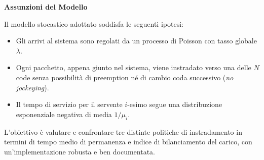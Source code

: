 \documentclass[12pt,a4paper]{article}
\begin{document}
\noindent
\textbf{Assunzioni del Modello}

Il modello stocastico adottato soddisfa le seguenti ipotesi:
\begin{itemize}
  \item Gli arrivi al sistema sono regolati da un processo di Poisson con tasso globale $\lambda$.
  \item Ogni pacchetto, appena giunto nel sistema, viene instradato verso una delle $N$ code senza possibilità di preemption né di cambio coda successivo (\textit{no jockeying}).
  \item Il tempo di servizio per il servente $i$-esimo segue una distribuzione esponenziale negativa di media $1/\mu_i$.
\end{itemize}

\noindent
L'obiettivo è valutare e confrontare tre distinte politiche di instradamento in termini di tempo medio di permanenza e indice di bilanciamento del carico, con un'implementazione robusta e ben documentata.
\end{document}
